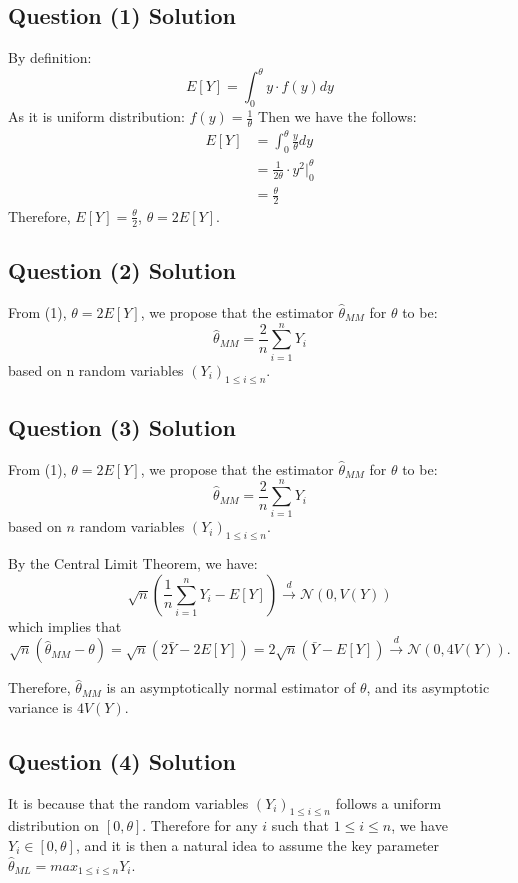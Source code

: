 \documentclass{article}
\begin{document}
\subsection{Question (1) Solution}
By definition:
$$E[Y] = \int^{\theta}_{0}y\cdot f(y)dy$$
As it is uniform distribution: $f(y) = \frac{1}{\theta}$
Then we have the follows:
\begin{align*}
E[Y] &= \int^{\theta}_{0}\frac{y}{\theta}dy
\\&= \frac{1}{2\theta}\cdot y^2|^{\theta}_0
\\&=\frac{\theta}{2}
\end{align*}
Therefore, $E[Y] = \frac{\theta}{2}$, $\theta = 2E[Y]$.

\subsection{Question (2) Solution}
From (1), $\theta = 2E[Y]$, we propose that the estimator $\hat{\theta}_{MM}$ for $\theta$ to be:
$$\hat{\theta}_{MM} = \frac{2}{n} \sum^{n}_{i=1}Y_i$$
based on n random variables $(Y_i)_{1\leq i \leq n}$.

\subsection{Question (3) Solution}
From (1), $\theta = 2E[Y]$, we propose that the estimator $\hat{\theta}_{MM}$ for $\theta$ to be:
\[
\hat{\theta}_{MM} = \frac{2}{n} \sum^{n}_{i=1}Y_i
\]
based on $n$ random variables $(Y_i)_{1\leq i \leq n}$.

By the Central Limit Theorem, we have:
\[
\sqrt{n}\left(\frac{1}{n}\sum^{n}_{i=1}Y_i - E[Y]\right) \xrightarrow{d} \mathcal{N}(0, V(Y))
\]
which implies that
\[
\sqrt{n}(\hat{\theta}_{MM} - \theta) = \sqrt{n} \left( 2\bar{Y} - 2E[Y] \right) = 2\sqrt{n}(\bar{Y} - E[Y]) \xrightarrow{d} \mathcal{N}(0, 4V(Y)).
\]

Therefore, $\hat{\theta}_{MM}$ is an asymptotically normal estimator of $\theta$, and its asymptotic variance is $4V(Y)$.

\subsection{Question (4) Solution}
It is because that the random variables $(Y_i)_{1\leq i \leq n}$ follows a uniform distribution on $[0, \theta]$.
Therefore for any $i$ such that $1 \leq i \leq n$, we have $Y_i \in [0, \theta]$, and it is then a natural idea to assume the key parameter $\hat{\theta}_{ML} = max_{1\leq i \leq n} {Y_i}$.
\end{document}
